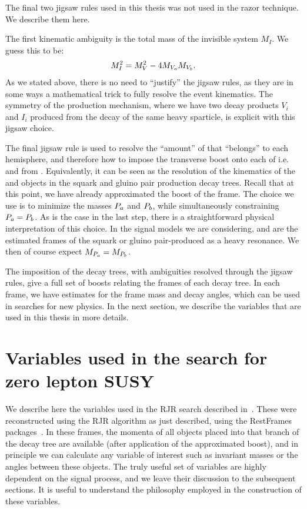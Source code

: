 The final two jigsaw rules used in this thesis was not used in the razor technique.
We describe them here.

The first kinematic ambiguity is the total mass of the invisible system $M_I$.
We guess this to be:
\begin{align}
M_I^2 = M_V^2 - 4 M_{V_a} M_{V_b}.
\end{align}
As we stated above, there is no need to ``justify'' the jigsaw rules, as they are in some ways a mathematical trick to fully resolve the event kinematics.
The symmetry of the production mechanism, where we have two decay products $V_i$ and $I_i$ produced from the decay of the same heavy sparticle, is explicit with this jigsaw choice.

The final jigsaw rule is used to resolve the ``amount'' of \met that ``belongs'' to each hemisphere, and therefore how to impose the transverse boost onto each of i.e. \Pa and \Pb from \PP.
Equivalently, it can be seen as the resolution of the kinematics of the \Ia and \Ib objects in the squark and gluino pair production decay trees.
Recall that at this point, we have already approximated the boost of the \PP frame.
The choice we use is to minimize the masses $P_a$ and $P_b$, while simultaneously constraining $P_a = P_b$.
As is the case in the last step, there is a straightforward physical interpretation of this choice.
In the signal models we are considering, \Pa and \Pb are the estimated frames of the squark or gluino pair-produced as a heavy resonance.
We then of course expect $M_{P_a} = M_{P_b}$.

The imposition of the decay trees, with ambiguities resolved through the jigsaw rules, give a full set of boosts relating the frames of each decay tree.
In each frame, we have estimates for the frame mass and decay angles, which can be used in searches for new physics.
In the next section, we describe the variables that are used in this thesis in more details.

\section{Variables used in the search for zero lepton SUSY}
\label{sec:rjr_hadronic}

We describe here the variables used in the RJR search described in~\cite{ATLAS-CONF-2016-078}.
These were reconstructed using the RJR algorithm as just described, using the RestFrames packages~\cite{RestFrames}.
In these frames, the momenta of all objects placed into that branch of the decay tree are available (after application of the approximated boost), and in principle we can calculate any variable of interest such as invariant masses or the angles between these objects.
The truly useful set of variables are highly dependent on the signal process, and we leave their discussion to the subsequent sections.
It is useful to understand the philosophy employed in the construction of these variables.

